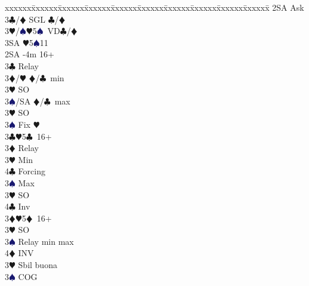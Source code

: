 \documentclass[a4paper,italian]{article}
\newcommand{\BC}{\textcolor{OliveGreen}{$\clubsuit$}}
\newcommand{\BD}{\textcolor{RedOrange}{$\vardiamondsuit$}}
\newcommand{\BH}{\textcolor{Red2}{$\varheartsuit${}}}
\newcommand{\BS}{\textcolor{MidnightBlue}{$\spadesuit${}}}
\newenvironment{bidtable}
{\begin{tabbing}

    xxxxxx\=xxxxxx\=xxxxxx\=xxxxxx\=xxxxxx\=xxxxxx\=xxxxxx\=xxxxxx\=xxxxxx\=xxxxxx\=\kill}
{\end{tabbing} }%
\begin{document}
\begin{multicols*}{2}
\begin{bidtable}
        2SA \> Ask\+\\
        3\BC/\BD \> SGL \BC /\BD \\
        3\BH/\BS {}\BH 5\BS\ VD\BC /\BD \\
        3SA \BH 5\BS 11\-\-\\
        2SA -4m 16+\+\\
        3\BC \> Relay\+\\
        3\BD/\BH \> \BD /\BC\ min\+\\
        3\BH \> SO\-\\
        3\BS/SA \> \BD /\BC\ max\-\\
        3\BH \> SO\\
        3\BS \> Fix \BH\-\\
        3\BC {}\BH 5\BC\ 16+\+\\
        3\BD \> Relay\+\\
        3\BH \> Min\+\\
        4\BC \> Forcing\-\\
        3\BS \> Max\-\\
        3\BH \> SO\\
        4\BC \> Inv\-\\
        3\BD {}\BH 5\BD\ 16+\+\\
        3\BH \> SO\\
        3\BS \> Relay min max\\
        4\BD \> INV\-\\
        3\BH \> Sbil buona\+\\
        3\BS \> COG
    \end{bidtable}
\end{multicols*}
\newpage
\end{document}
